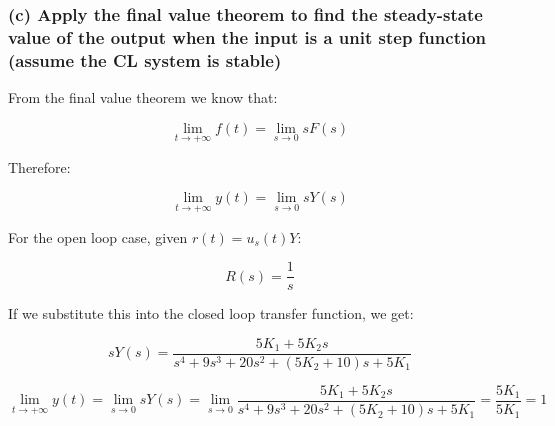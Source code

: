 \documentclass[12pt, letterpaper]{../assignment}
\begin{document}
\subsubsection*{(c) Apply the final value theorem to find the steady-state value of the output when the input is a unit step function
(assume the CL system is stable)}

From the final value theorem we know that:

$$ \lim_{t\to+\infty} f(t) = \lim_{s\to 0} s F(s) $$

Therefore:

$$ \lim_{t\to+\infty} y(t) = \lim_{s\to 0} s Y(s) $$

For the open loop case, given $r(t) = u_s(t) Y$:

$$R(s) = \frac{1}{s}$$

If we substitute this into the closed loop transfer function, we get:

$$ s Y(s) = \frac{5 K_1 + 5 K_2 s}{s^4 + 9 s^3 + 20 s^2 + (5 K_2 + 10) s + 5 K_1}$$

$$ \lim_{t\to+\infty} y(t) = \lim_{s\to 0} s Y(s) =
    \lim_{s\to 0} \frac{5 K_1 + 5 K_2 s}{s^4 + 9 s^3 + 20 s^2 + (5 K_2 + 10) s + 5 K_1} = \frac{5 K_1}{5 K_1} = 1 $$
\end{document}
